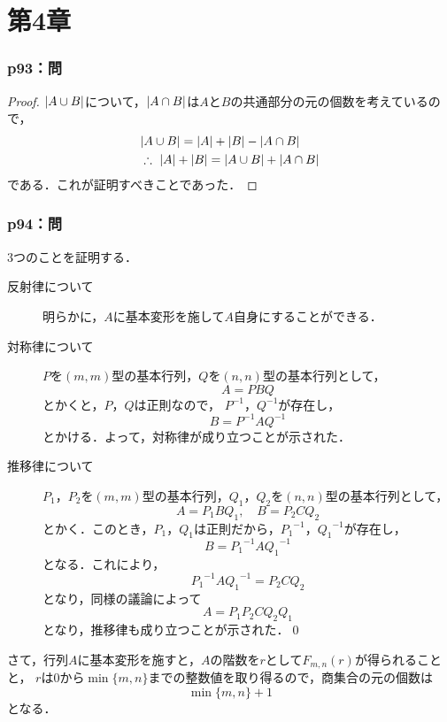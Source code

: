 \documentclass[a4paper,10pt,fleqn]{ltjsarticle}
\begin{document}
\part*{第4章}



\section*{p93：問}

\begin{leftbar}
  \begin{proof}
    $\abs{A \cup B}$について，$ \abs{A \cap B}$は$A$と$B$の共通部分の元の個数を考えているので，
    \begin{align*}
       & \abs{A \cup B} = \abs{A}+\abs{B} - \abs{A \cap B}              \\
       & \therefore ~ \abs{A}+\abs{B} = \abs{A \cup B} + \abs{A \cap B}
    \end{align*}
    である．これが証明すべきことであった．
  \end{proof}
\end{leftbar}

\newpage


\section*{p94：問}

\begin{tleftbar}
  3つのことを証明する．
  \begin{description}
    \item [反射律について] 明らかに，$A$に基本変形を施して$A$自身にすることができる．
    \item [対称律について] $P$を$(m,m)$型の基本行列，$Q$を$(n,n)$型の基本行列として，
          \[
            A = P B Q
          \]
          とかくと，$P$，$Q$は正則なので， $P^{-1}$，$Q^{-1}$が存在し，
          \[
            B= P^{-1} A Q^{-1}
          \]
          とかける．よって，対称律が成り立つことが示された．
    \item[推移律について] $P_1$，$P_2$を$(m,m)$型の基本行列，$Q_1$，$Q_2$を$(n,n)$型の基本行列として，
          \[
            A = P_1 B Q_1 , \quad B = P_2 C Q_2
          \]
          とかく．このとき，$P_1$，$Q_1$は正則だから，${P_1}^{-1}$，${Q_1}^{-1}$が存在し，
          \[
            B = {P_1}^{-1} A {Q_1}^{-1}
          \]
          となる．これにより，
          \[
            {P_1}^{-1} A {Q_1}^{-1} =P_2 C Q_2
          \]
          となり，同様の議論によって
          \[
            A = P_1 P_2 C Q_2 Q_1
          \]
          となり，推移律も成り立つことが示された．\qed
  \end{description}
  さて，行列$A$に基本変形を施すと，$A$の階数を$r$として$F_{m,n} (r)$が得られることと，
  $r$は$0$から$\min \{m,n\}$までの整数値を取り得るので，商集合の元の個数は
  \[
    \min \{ m , n \} +1
  \]
  となる．
\end{tleftbar}
\end{document}
